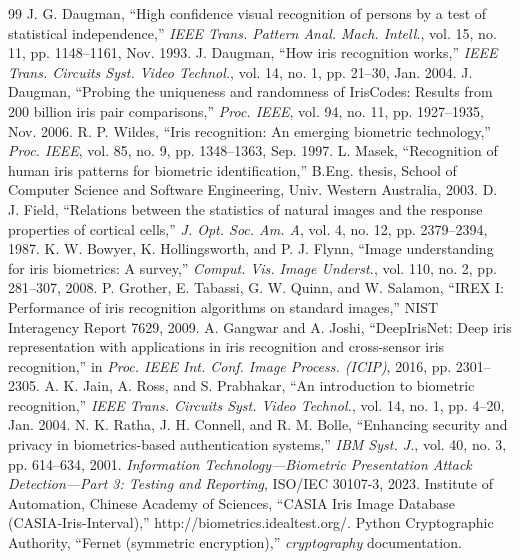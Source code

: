 \documentclass[conference]{IEEEtran}
\begin{document}
\begin{thebibliography}{99}
 J. G. Daugman, ``High confidence visual recognition of persons by a test of statistical independence,'' \textit{IEEE Trans. Pattern Anal. Mach. Intell.}, vol. 15, no. 11, pp. 1148--1161, Nov. 1993.
 J. Daugman, ``How iris recognition works,'' \textit{IEEE Trans. Circuits Syst. Video Technol.}, vol. 14, no. 1, pp. 21--30, Jan. 2004.
 J. Daugman, ``Probing the uniqueness and randomness of IrisCodes: Results from 200 billion iris pair comparisons,'' \textit{Proc. IEEE}, vol. 94, no. 11, pp. 1927--1935, Nov. 2006.
 R. P. Wildes, ``Iris recognition: An emerging biometric technology,'' \textit{Proc. IEEE}, vol. 85, no. 9, pp. 1348--1363, Sep. 1997.
 L. Masek, ``Recognition of human iris patterns for biometric identification,'' B.Eng. thesis, School of Computer Science and Software Engineering, Univ. Western Australia, 2003.
 D. J. Field, ``Relations between the statistics of natural images and the response properties of cortical cells,'' \textit{J. Opt. Soc. Am. A}, vol. 4, no. 12, pp. 2379--2394, 1987.
 K. W. Bowyer, K. Hollingsworth, and P. J. Flynn, ``Image understanding for iris biometrics: A survey,'' \textit{Comput. Vis. Image Underst.}, vol. 110, no. 2, pp. 281--307, 2008.
 P. Grother, E. Tabassi, G. W. Quinn, and W. Salamon, ``IREX I: Performance of iris recognition algorithms on standard images,'' NIST Interagency Report 7629, 2009.
 A. Gangwar and A. Joshi, ``DeepIrisNet: Deep iris representation with applications in iris recognition and cross-sensor iris recognition,'' in \textit{Proc. IEEE Int. Conf. Image Process. (ICIP)}, 2016, pp. 2301--2305.
 A. K. Jain, A. Ross, and S. Prabhakar, ``An introduction to biometric recognition,'' \textit{IEEE Trans. Circuits Syst. Video Technol.}, vol. 14, no. 1, pp. 4--20, Jan. 2004.
 N. K. Ratha, J. H. Connell, and R. M. Bolle, ``Enhancing security and privacy in biometrics-based authentication systems,'' \textit{IBM Syst. J.}, vol. 40, no. 3, pp. 614--634, 2001.
 \textit{Information Technology---Biometric Presentation Attack Detection---Part 3: Testing and Reporting}, ISO/IEC 30107-3, 2023.
 Institute of Automation, Chinese Academy of Sciences, ``CASIA Iris Image Database (CASIA-Iris-Interval),'' http://biometrics.idealtest.org/.
 Python Cryptographic Authority, ``Fernet (symmetric encryption),'' \textit{cryptography} documentation.

\end{thebibliography}
\end{document}
